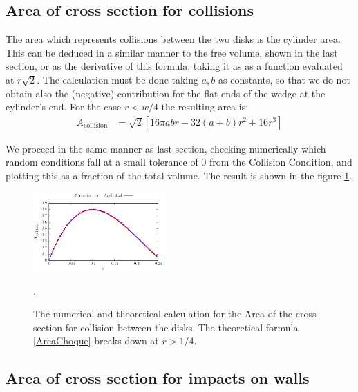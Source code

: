\documentclass[letterpaper,10pt, jcp, aps]{revtex4-1}
\begin{document}
\subsection{Area of cross section for collisions}

The area which represents collisions between the two disks is the cylinder area. 
This can be deduced in a similar manner to the free volume, shown in the last
section, or as the derivative of this formula, taking it as as a function evaluated at 
$r\sqrt{2}$. The calculation must be done taking $a,b$ as constants, so that
we do not obtain also the (negative) contribution for the flat ends of
the wedge at the cylinder's end. For the case $r<w/4$ the resulting area is:
\begin{align}\label{AreaChoque}
A_\text{collision} & =\sqrt{2}[  
16\pi a b r -32 (a+b)r^2 +16 r^3 ] 
\end{align}

We proceed in the same manner as last section, checking numerically which
random
conditions fall at a small tolerance of $0$ from the Collision Condition, and
plotting this as a fraction of the total volume. The result is shown in the
figure \ref{AreaChoqueTeoyNum}. 
\begin{figure}
\centering
\includegraphics[width=0.45\textwidth]{./FigurasPerfectas/AreaCol02.pdf}
\caption{The numerical and theoretical calculation for the Area of the cross section
for collision between the disks.  The theoretical formula 
\ref{AreaChoque} breaks down at
$r>1/4$.}
\label{AreaChoqueTeoyNum}.
\end{figure}


\subsection{Area of cross section for  impacts on walls}
\end{document}
